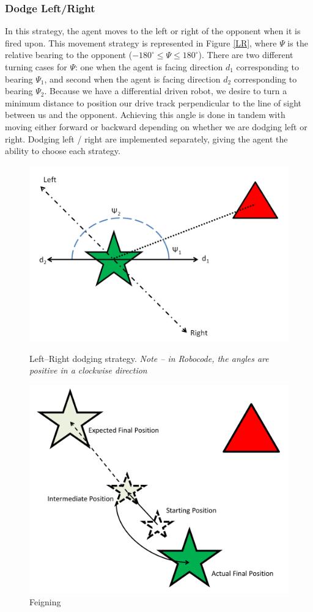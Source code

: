 \documentclass{article}
\theoremstyle{plain}
\theoremstyle{definition}
\theoremstyle{remark}
\begin{document}
\subsubsection*{Dodge Left/Right}
In this strategy, the agent moves to the left or right of the opponent when it is fired upon. This movement strategy is represented in Figure \ref{LR}, where $\Psi$ is the relative bearing to the opponent ($-180^{\circ} \leq \Psi \leq 180^{\circ}$). There are two different turning cases for $\Psi$: one when the agent is facing direction $d_1$ corresponding to bearing $\Psi_1$, and second when the agent is facing direction $d_2$ corresponding to bearing $\Psi_2$. Because we have a differential driven robot, we desire to turn a minimum distance to position our drive track perpendicular to the line of sight between us and the opponent. Achieving this angle is done in tandem with moving either forward or backward depending on whether we are dodging left or right. Dodging left / right are implemented separately, giving the agent the ability to choose each strategy.\\

\begin{figure}[h]
\begin{minipage}[b]{0.5\linewidth}
	\centering
		\includegraphics[width=6 cm]{LR}
	\caption{Left--Right dodging strategy. \emph{Note -- in Robocode, the angles are positive in a clockwise direction}}
	\label{LR}
\end{minipage}
\hspace{0.5cm}
\begin{minipage}[b]{0.5\linewidth}
	\centering
		\includegraphics[width=6 cm]{Feign.png}
	\caption{Feigning}
	\label{feign}
\end{minipage}
\end{figure}
\end{document}
